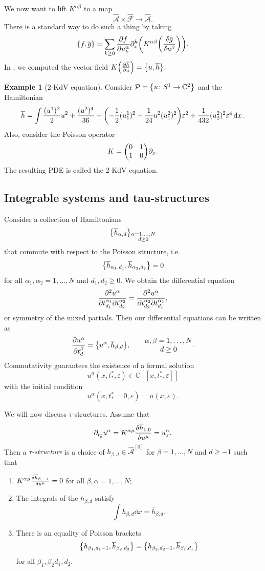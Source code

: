 \documentclass[leqno, openany]{memoir}
\theoremstyle{definition}
\newtheorem{exm}[thm]{Example}
\theoremstyle{remark}
\theoremstyle{plain}
\theoremstyle{definition}
\theoremstyle{remark}
\newcommand{\C}{\mathbb{C}}
\newcommand{\ep}{\varepsilon}
\newcommand{\mc}[1]{\mathcal{#1}}
\newcommand{\ol}[1]{\overline{#1}}
\newcommand{\wh}[1]{\widehat{#1}}
\begin{document}
We now want to lift $K^{\alpha\beta}$ to a map
\[ \wh{\mc{A}} \times \wh{\mc{F}} \to \wh{\mc{A}}. \]
There is a standard way to do such a thing by taking
\[ \qty{f, \ol{g}} = \sum_{k \geq 0} \pdv{f}{u_k^{\alpha}} \partial_x^k \qty(K^{\alpha\beta} \qty(\fdv{\ol{g}}{u^{\beta}})). \]
In , we computed the vector field $K \qty(\pdv{\ol{h}}{u}) = \qty{u, \ol{h}}$.

\begin{exm}[2-KdV equation]
    Consider $\mc{P} = \qty{u \colon S^1 \to \C^2}$ and the Hamiltonian
    \[ \ol{h} = \int \frac{(u^1)^2}{2} u^2 + \frac{(u^2)^4}{36} + \qty(-\frac{1}{2} (u_1^1)^2 - \frac{1}{24} u^2 (u_1^2)^2)\ep^2 + \frac{1}{432} (u_2^2)^2 \ep^4 \dd{x}. \]
    Also, consider the Poisson operator
    \[ K = \mqty(0 & 1 \\ 1 & 0) \partial_x. \]
    The resulting PDE is called the 2-KdV equation.
\end{exm}

\subsection{Integrable systems and tau-structures}

Consider a collection of Hamiltonians
\[ \qty{\ol{h}_{\alpha, d}}_{\substack{\alpha = 1, \ldots, N \\ d \geq 0}} \]
that commute with respect to the Poisson structure, i.e.
\[ \qty{\ol{h}_{\alpha_1, d_1}, \ol{h}_{\alpha_2, d_2}} = 0 \]
for all $\alpha_1, \alpha_2 = 1, \ldots, N$ and $d_1, d_2 \geq 0$. We obtain the differential equation
\[ \pdv{u^{\alpha}}{t_{d_1}^{\alpha_1}}{t_{d_2}^{\alpha_2}} = \pdv{u^{\alpha}}{t_{d_2}^{\alpha_2}}{t_{d_1}^{\alpha_1}}, \]
or symmetry of the mixed partials. Then our differential equations can be written as
\[ \pdv{u^{\alpha}}{t_d^{\beta}} = \qty{u^{\alpha}, \ol{h}_{\beta, d}}, \qquad \Vectorstack{{\alpha, \beta = 1, \ldots, N} {d \geq 0}}. \]
Commutativity guarantees the existence of a formal solution
\[ u^{\alpha}(x, t_*^*, \ep) \in \C[[x, t_*^*, \ep]] \]
with the initial condition
\[ u^{\alpha}(x, t_*^* = 0, \ep) = \ol{u}(x, \ep). \]

We will now discuss $\tau$-structures. Assume that 
\[ \partial_{t_0^1} u^{\alpha} = K^{\alpha\mu} \fdv{\ol{h}_{1,0}}{u^{\mu}} = u_x^{\alpha}. \]
Then a \textit{$\tau$-structure} is a choice of $h_{\beta, d} \in \wh{\mc{A}}^{[0]}$ for $\beta = 1, \ldots, N$ and $d \geq -1$ such that
\begin{enumerate}
    \item $K^{\alpha\mu} \fdv{\ol{h}_{\beta,-1}}{u^{\mu}} = 0$ for all $\beta, \alpha = 1, \ldots, N$;
    \item The integrals of the $h_{\beta, d}$ satisfy
        \[ \int h_{\beta, d} \dd{x} = \ol{h}_{\beta, d}. \]
    \item There is an equality of Poisson brackets
        \[ \qty{h_{\beta_1, d_1-1}, \ol{h}_{\beta_2, d_2}} = \qty{h_{\beta_2, d_2-1}, \ol{h}_{\beta_1, d_1}} \]
        for all $\beta_1, \beta_2 d_1, d_2$.
\end{enumerate}
\end{document}
